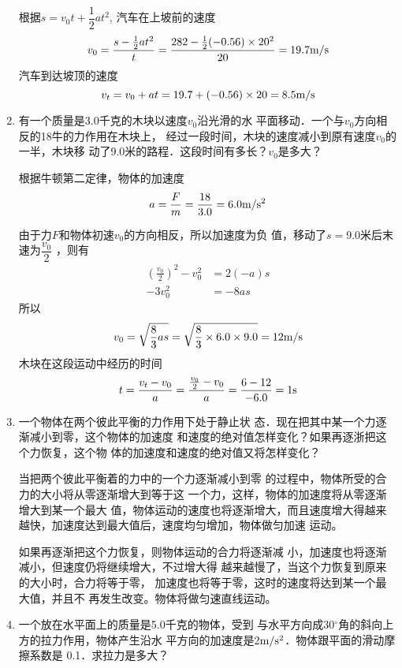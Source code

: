 \begin{enumerate}
\begin{solution}
根据$s=v_0t+\dfrac{1}{2}at^2$, 汽车在上坡前的速度
\[v_0=\frac{s-\frac{1}{2}at^2}{t}=\frac{282-\frac{1}{2}(-0.56)\times 20^2}{20}=19.7\text{m}/\text{s}\]
汽车到达坡顶的速度
\[v_t=v_0+at=19.7+(-0.56)\times20=8.5\text{m}/\text{s}\]
\end{solution}
\item  有一个质量是3.0千克的木块以速度$v_0$沿光滑的水
平面移动．一个与$v_0$方向相反的18牛的力作用在木块上，
经过一段时间，木块的速度减小到原有速度$v_0$的一半，木块移
动了9.0米的路程．这段时间有多长？$v_0$是多大？

\begin{solution}
根据牛顿第二定律，物体的加速度
\[a=\frac{F}{m}=\frac{18}{3.0}=6.0\text{m}/\text{s}^2\]

由于力$F$和物体初速$v_0$的方向相反，所以加速度为负
值，移动了$s=9.0$米后末速为$\dfrac{v_0}{2}$
，则有
\[\begin{split}
    \left(\frac{v_0}{2}\right)^2-v^2_0&=2(-a)s\\
    -3v_0^2&=-8as
\end{split}\]
所以
\[v_0=\sqrt{\frac{8}{3}as}=\sqrt{\frac{8}{3}\times 6.0\times 9.0}=12\text{m}/\text{s}\]
木块在这段运动中经历的时间
\[t=\frac{v_t-v_0}{a}=\frac{\frac{v_0}{2}-v_0}{a}=\frac{6-12}{-6.0}=1{\rm s}\]
\end{solution}
\item  一个物体在两个彼此平衡的力作用下处于静止状
态．现在把其中某一个力逐渐减小到零，这个物体的加速度
和速度的绝对值怎样变化？如果再逐浙把这个力恢复，这个物
体的加速度和速度的绝对值又将怎样变化？

\begin{solution}
    当把两个彼此平衡着的力中的一个力逐渐减小到零
的过程中，物体所受的合力的大小将从零逐渐增大到等于这
一个力，这样，物体的加速度将从零逐渐增大到某一个最大
值，物体运动的速度也将逐渐增大，而且速度增大得越来越快，加速度达到最大值后，速度均匀增加，物体做匀加速
运动。

如果再逐渐把这个力恢复，则物体运动的合力将逐渐减
小，加速度也将逐渐减小，但速度仍将继续增大，不过增大得
越来越慢了，当这个力恢复到原来的大小时，合力将等于零，
加速度也将等于零，这时的速度将达到某一个最大值，并且不
再发生改变。物体将做匀速直线运动。
\end{solution}
\item  一个放在水平面上的质量是5.0千克的物体，受到
与水平方向成30$^{\circ}$角的斜向上方的拉力作用，物体产生沿水
平方向的加速度是2$\text{m}/\text{s}^2$．物体跟平面的滑动摩擦系数是
0.1．求拉力是多大？

\begin{figure}[htp]
    \centering
{}
\end{figure}
\end{enumerate}
